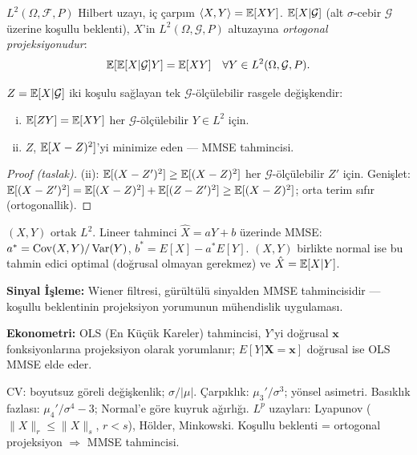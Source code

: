 \begin{tanim}\label{def:projeksiyon}
$L^2(\Omega,\mathcal{F},P)$ Hilbert uzayı, iç çarpım $\langle X,Y\rangle=\mathbb{E}[XY]$. $\mathbb{E}[X|\mathcal{G}]$ (alt $\sigma$-cebir $\mathcal{G}$ üzerine koşullu beklenti), $X$'in $L^2(\Omega,\mathcal{G},P)$ altuzayına \emph{ortogonal projeksiyonudur}:
\[
  \mathbb{E}[\mathbb{E}[X|\mathcal{G}]Y] = \mathbb{E}[XY] \quad \forall Y\in L^2(\Omega,\mathcal{G},P).
\]
\end{tanim}

\begin{teorem}\label{thm:projeksiyon}
$Z=\mathbb{E}[X|\mathcal{G}]$ iki koşulu sağlayan tek $\mathcal{G}$-ölçülebilir rasgele değişkendir:
\begin{enumerate}[(i)]
  \item $\mathbb{E}[ZY]=\mathbb{E}[XY]$ her $\mathcal{G}$-ölçülebilir $Y\in L^2$ için.
  \item $Z$, $\mathbb{E}[X-Z)^2]$'yi minimize eden --- MMSE tahmincisi.
\end{enumerate}
\end{teorem}

\begin{proof}[Proof (taslak)]
(ii): $\mathbb{E}[(X-Z')^2]\geq\mathbb{E}[(X-Z)^2]$ her $\mathcal{G}$-ölçülebilir $Z'$ için. Genişlet: $\mathbb{E}[(X-Z')^2]=\mathbb{E}[(X-Z)^2]+\mathbb{E}[(Z-Z')^2]\geq\mathbb{E}[(X-Z)^2]$; orta terim sıfır (ortogonallik).
\end{proof}

\begin{ornek}\label{ex:lineer_mmse}
$(X,Y)$ ortak $L^2$. Lineer tahminci $\hat X = aY+b$ üzerinde MMSE:
$a^*=\operatorname{Cov}(X,Y)/\operatorname{Var}(Y)$, $b^*=E[X]-a^*E[Y]$.
$(X,Y)$ birlikte normal ise bu tahmin edici optimal (doğrusal olmayan gerekmez) ve $\hat X=\mathbb{E}[X|Y]$.
\end{ornek}

\begin{disiplinlerarasibaglan}
\textbf{Sinyal İşleme:} Wiener filtresi, gürültülü sinyalden MMSE tahmincisidir --- koşullu beklentinin projeksiyon yorumunun mühendislik uygulaması.

\textbf{Ekonometri:} OLS (En Küçük Kareler) tahmincisi, $Y$'yi doğrusal $\mathbf{x}$ fonksiyonlarına projeksiyon olarak yorumlanır; $E[Y|\mathbf{X}=\mathbf{x}]$ doğrusal ise OLS MMSE elde eder.
\end{disiplinlerarasibaglan}

\begin{mikroozet}
CV: boyutsuz göreli değişkenlik; $\sigma/|\mu|$.
Çarpıklık: $\mu_3'/\sigma^3$; yönsel asimetri.
Basıklık fazlası: $\mu_4'/\sigma^4 - 3$; Normal'e göre kuyruk ağırlığı.
$L^p$ uzayları: Lyapunov ($\|X\|_r\leq\|X\|_s$, $r<s$), Hölder, Minkowski.
Koşullu beklenti = ortogonal projeksiyon $\Rightarrow$ MMSE tahmincisi.
\end{mikroozet}

